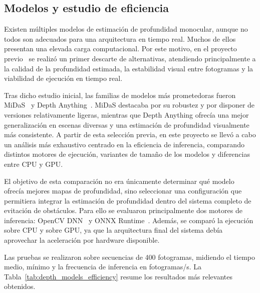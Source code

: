 \subsection{Modelos y estudio de eficiencia}

Existen múltiples modelos de estimación de profundidad monocular, aunque no todos son adecuados para una arquitectura en 
tiempo real. Muchos de ellos presentan una elevada carga computacional. Por este motivo, en el proyecto 
previo~\cite{estudio-nav2D} se realizó un primer descarte de alternativas, atendiendo principalmente a la calidad de la 
profundidad estimada, la estabilidad visual entre fotogramas y la viabilidad de ejecución en tiempo real.

Tras dicho estudio inicial, las familias de modelos más prometedoras fueron MiDaS~\cite{Ranftl2020} y 
Depth Anything~\cite{cheng2024depthanything}. MiDaS destacaba por su robustez y por disponer de versiones relativamente 
ligeras, mientras que Depth Anything ofrecía una mejor generalización en escenas diversas y una estimación de profundidad 
visualmente más consistente. A partir de esta selección previa, en este proyecto se llevó a cabo un análisis más exhaustivo 
centrado en la eficiencia de inferencia, comparando distintos motores de ejecución, variantes de tamaño de los modelos y 
diferencias entre CPU y GPU.

El objetivo de esta comparación no era únicamente determinar qué modelo ofrecía mejores mapas de profundidad, sino 
seleccionar una configuración que permitiera integrar la estimación de profundidad dentro del sistema completo de 
evitación de obstáculos. Para ello se evaluaron principalmente dos motores de inferencia: OpenCV DNN~\cite{opencv_repo} y 
ONNX Runtime~\cite{onnx_repo}. Además, se comparó la ejecución sobre CPU y sobre GPU, ya que la arquitectura final del 
sistema debía aprovechar la aceleración por hardware disponible.

Las pruebas se realizaron sobre secuencias de 400 fotogramas, midiendo el tiempo medio, mínimo y la frecuencia de inferencia en fotogramas/s. La 
Tabla~\ref{tab:depth_models_efficiency} resume los resultados más relevantes obtenidos.

